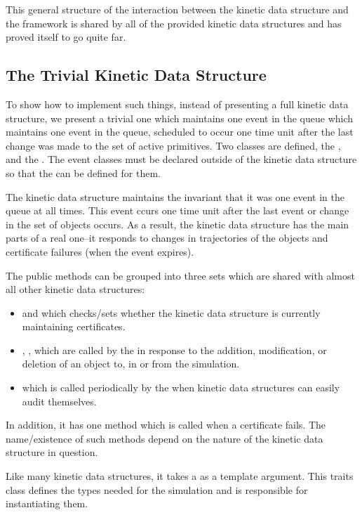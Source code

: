 This general structure of the interaction between the kinetic data
structure and the framework is shared by all of the provided kinetic
data structures and has proved itself to go quite far.

\subsection{The Trivial Kinetic Data Structure\label{sec:kds_trivial_example}}

To show how to implement such things, instead of presenting a full
kinetic data structure, we present a trivial one which maintains one
event in the queue which maintains one event in the queue, scheduled
to occur one time unit after the last change was made to the set of
active primitives.  Two classes are defined, the ,
and the . The event classes must be declared outside
of the kinetic data structure so that the  can be
defined for them.

The kinetic data structure maintains the invariant that it was one
event in the queue at all times. This event ccurs one time unit after
the last event or change in the set of objects occurs. As a result,
the kinetic data structure has the main parts of a real one--it
responds to changes in trajectories of the objects and certificate
failures (when the event expires).

 The public methods can be grouped into three sets which are shared
 with almost all other kinetic data structures:
\begin{itemize}
\item {} and  which
  checks/sets whether the kinetic data structure is currently
  maintaining certificates.
\item {}, ,  which are called by the
   in response to the
  addition, modification, or deletion of an object to, in or from the
  simulation.
\item {} which is called periodically by the
   when kinetic data structures can
  easily audit themselves.
\end{itemize} 

In addition, it has one method which is called when a certificate
fails. The name/existence of such methods depend on the nature of the
kinetic data structure in question.

Like many kinetic data structures, it takes a 
as a template argument. This traits class defines the types needed for
the simulation and is responsible for instantiating them.

